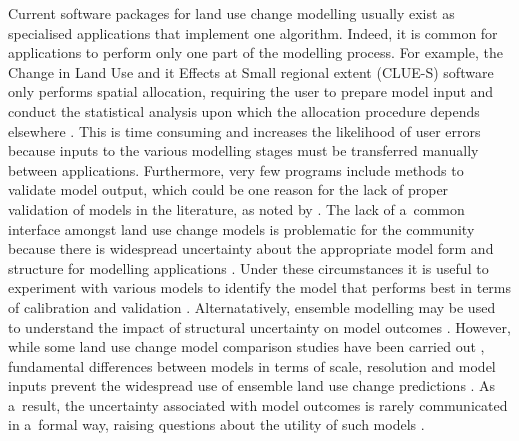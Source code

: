 \documentclass{icldt}\usepackage[]{graphicx}\usepackage[]{color}
\begin{document}
Current software packages for land use change modelling usually exist as specialised applications that implement one algorithm. Indeed, it is common for applications to perform only one part of the modelling process. For example, the Change in Land Use and it Effects at Small regional extent (CLUE-S) software only performs spatial allocation, requiring the user to prepare model input and conduct the statistical analysis upon which the allocation procedure depends elsewhere \citep{verburg2002}. This is time consuming and increases the likelihood of user errors because inputs to the various modelling stages must be transferred manually between applications. Furthermore, very few programs include methods to validate model output, which could be one reason for the lack of proper validation of models in the literature, as noted by \citet{rosa2014}. The lack of a~common interface amongst land use change models is problematic for the community because there is widespread uncertainty about the appropriate model form and structure for modelling applications \citep{verburg2013}. Under these circumstances it is useful to experiment with various models to identify the model that performs best in terms of calibration and validation \citep{schmitz2009}. Alternatatively, ensemble modelling may be used to understand the impact of structural uncertainty on model outcomes \citep{knutti2012}. However, while some land use change model comparison studies have been carried out \citep[e.g][]{perez-vega2012,mas2014,rosa2014}, fundamental differences between models in terms of scale, resolution and model inputs prevent the widespread use of ensemble land use change predictions \citep{rosa2014}. As a~result, the uncertainty associated with model outcomes is rarely communicated in a~formal way, raising questions about the utility of such models \citep{pontius2005-a}. \\
\end{document}
